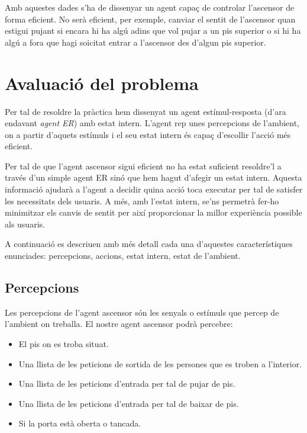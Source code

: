 \documentclass[a4paper, 11pt]{article}
\begin{document}
Amb aquestes dades s'ha de dissenyar un agent capaç de controlar l'ascensor de
forma eficient. No serà eficient, per exemple, canviar el sentit de l'ascensor
quan estigui pujant si encara hi ha algú adins que vol pujar a un pis superior
o si hi ha algú a fora que hagi so\lgem icitat entrar a l'ascensor des d'algun
pis superior.

\section{Avaluació del problema}

Per tal de resoldre la pràctica hem dissenyat un agent estímul-resposta (d'ara
endavant \emph{agent ER}) amb estat intern. L'agent rep unes percepcions de
l'ambient, on a partir d'aquets estímuls i el seu estat intern és capaç
d'escollir l'acció més eficient.

Per tal de que l'agent ascensor sigui eficient no ha estat suficient resoldre'l
a través d'un simple agent ER sinó que hem hagut d'afegir un estat intern.
Aquesta informació ajudarà a l'agent a decidir quina acció toca executar per
tal de satisfer les necessitats dels usuaris. A més, amb l'estat intern, se'ns
permetrà fer-ho minimitzar els canvis de sentit per així proporcionar la millor
experiència possible als usuaris.

A continuació es descriuen amb més detall cada una d'aquestes característiques
enunciades: percepcions, accions, estat intern, estat de l'ambient.

\subsection{Percepcions}

Les percepcions de l'agent ascensor són les senyals o estímuls que percep de
l'ambient on treballa. El nostre agent ascensor podrà percebre:

\begin{itemize}
  \item El pis on es troba situat.
  \item Una llista de les peticions de sortida de les persones que es troben a 
  l'interior.
  \item Una llista de les peticions d'entrada per tal de pujar de pis.
  \item Una llista de les peticions d'entrada per tal de baixar de pis.
  \item Si la porta està oberta o tancada.
\end{itemize}
\end{document}
